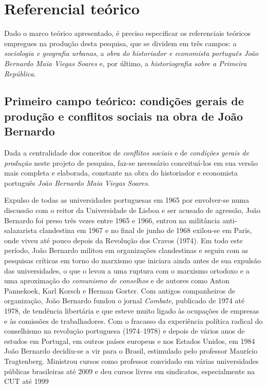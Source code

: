 \section{Referencial teórico}
\label{sec:refeteor}

Dado o marco teórico apresentado, é preciso especificar os referenciais teóricos empregues na produção desta pesquisa, que se dividem em três campos: a \textit{sociologia e geografia urbanas}, a \textit{obra do historiador e economista português João Bernardo Maia Viegas Soares} e, por último, a \textit{historiografia sobre a Primeira República}.

\subsection{Primeiro campo teórico: condições gerais de produção e conflitos sociais na obra de João Bernardo}
\label{subsec:cgpcsjobe}

Dada a centralidade dos conceitos de \textit{conflitos sociais} e de \textit{condições gerais de produção} neste projeto de pesquisa, faz-se necessário conceituá-los em sua versão mais completa e elaborada, constante na obra do historiador e economista português \textit{João Bernardo Maia Viegas Soares}. 

Expulso de todas as universidades portuguesas em 1965 por envolver-se numa discussão com o reitor da Universidade de Lisboa e ser acusado de agressão, João Bernardo foi preso três vezes entre 1965 e 1966, entrou na militância anti-salazarista clandestina em 1967 e no final de junho de 1968 exilou-se em Paris, onde viveu até pouco depois da Revolução dos Cravos (1974). Em todo este período, João Bernardo militou em organizações clandestinas e seguiu com as pesquisas críticas em torno do marxismo que iniciara ainda antes de sua expulsão das universidades, o que o levou a uma ruptura com o marxismo ortodoxo e a uma aproximação do \textit{comunismo de conselhos} e de autores como Anton Pannekoek, Karl Korsch e Herman Gorter. Com antigos companheiros de organização, João Bernardo fundou o jornal \textit{Combate}, publicado de 1974 até 1978, de tendência libertária e que esteve muito ligado às ocupações de empresas e às comissões de trabalhadores. Com o fracasso da experiência política radical do conselhismo na revolução portuguesa (1974–1978) e depois de vários anos de estudos em Portugal, em outros países europeus e nos Estados Unidos, em 1984 João Bernardo decidiu-se a vir para o Brasil, estimulado pelo professor Maurício Tragtenberg. Ministrou cursos como professor convidado em várias universidades públicas brasileiras até 2009 e deu cursos livres em sindicatos, especialmente na CUT até 1999 \cite{BERNARDO2014} 

